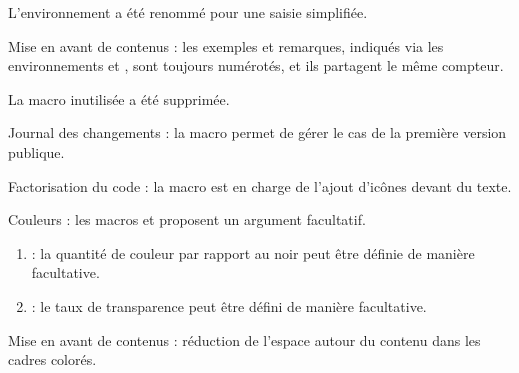 \documentclass[12pt, a4paper]{article}
\begin{document}
\begin{tdocbreak}
	\item L'environnement  a été renommé  pour une saisie simplifiée.

	\item Mise en avant de contenus : les exemples et remarques, indiqués via les environnements  et , sont toujours numérotés, et ils partagent le même compteur.

	\item La macro inutilisée  a été supprimée.
\end{tdocbreak}


\begin{tdocnew}
    \item Journal des changements : la macro  permet de gérer le cas de la première version publique.

    \item Factorisation du code : la macro  est en charge de l'ajout d'icônes devant du texte.
\end{tdocnew}


\begin{tdocupdate}
	\item Couleurs : les macros  et  proposent un argument facultatif.
	\begin{enumerate}
		\item {} : la quantité de couleur par rapport au noir peut être définie de manière facultative.

		\item {} : le taux de transparence peut être défini de manière facultative.
	\end{enumerate}

    \item Mise en avant de contenus : réduction de l'espace autour du contenu dans les cadres colorés.
\end{tdocupdate}
\end{document}
